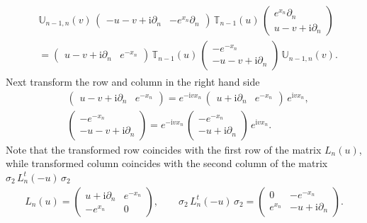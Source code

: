 \documentclass[11pt]{article}
\numberwithin{equation}{section}
\theoremstyle{plain}
\theoremstyle{definition}
\newcommand{\T}{\mathbb{T}}
\newcommand{\MMO}{\mathbb{U}}
\renewcommand{\imath}{\mathrm{i}}
\begin{document}
\begin{align} \label{UT-rel}
	\begin{aligned}
		& \MMO_{n-1,n}(v)\,
		\begin{pmatrix} -u-v+\imath\partial_n & -e^{x_n}\partial_n  \end{pmatrix}\,
		\T_{n-1}(u)\,
		\begin{pmatrix}
			e^{x_n}\partial_n \\[3pt]
			u-v+\imath\partial_n \end{pmatrix} \\[6pt]
		& = \begin{pmatrix} u-v+\imath\partial_n & e^{-x_n} \end{pmatrix}\,
		\T_{n-1}(u)\,
		\begin{pmatrix}
			-e^{-x_n} \\[3pt]
			-u-v+\imath\partial_n \end{pmatrix} \,
		\MMO_{n-1,n}(v).
	\end{aligned}
\end{align}
Next transform the row and column in the right hand side
\begin{align}
& \begin{pmatrix} u-v+\imath\partial_n & e^{-x_n} \end{pmatrix} =
e^{-\imath v x_n}\,\begin{pmatrix} u+\imath\partial_n & e^{-x_n} \end{pmatrix}\,e^{\imath v x_n} , \\[6pt] 
& \begin{pmatrix}
-e^{-x_n} \\[3pt]
-u-v+\imath\partial_n \end{pmatrix}= e^{-\imath v x_n}\, \begin{pmatrix}
-e^{-x_n} \\[3pt]
-u+\imath\partial_n \end{pmatrix} \,e^{\imath v x_n}.
\end{align}
Note that the transformed row coincides with the first row of the matrix $L_n(u)$, while transformed column coincides with the second column of the matrix $\sigma_2\,L^t_n(-u)\,\sigma_2$
\begin{align}
	L_n(u) = \begin{pmatrix}
		u + \imath \partial_n & e^{-x_n} \\[3pt]
		-e^{x_n} & 0
	\end{pmatrix}, \qquad 
	\sigma_2 \, L^t_n(-u) \, \sigma_2 = \begin{pmatrix}
		0 & -e^{-x_n} \\[3pt]
		e^{x_n} & -u + \imath \partial_n
	\end{pmatrix}.
\end{align}
\end{document}
